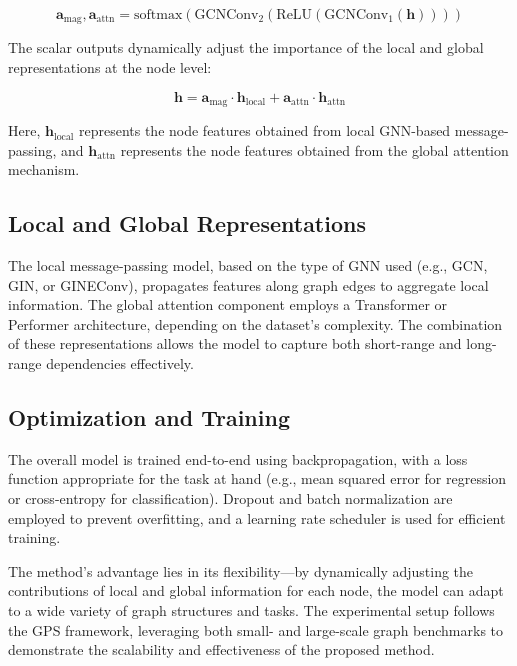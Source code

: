 \documentclass{acmart}
\begin{document}
\begin{equation}
\mathbf{a}_{\text{mag}}, \mathbf{a}_{\text{attn}} = \text{softmax}\left(\text{GCNConv}_2\left(\text{ReLU}\left(\text{GCNConv}_1(\mathbf{h})\right)\right)\right)
\end{equation}

The scalar outputs dynamically adjust the importance of the local and global representations at the node level:

\begin{equation}
\mathbf{h} = \mathbf{a}_{\text{mag}} \cdot \mathbf{h}_{\text{local}} + \mathbf{a}_{\text{attn}} \cdot \mathbf{h}_{\text{attn}}
\end{equation}

Here, $\mathbf{h}_{\text{local}}$ represents the node features obtained from local GNN-based message-passing, and $\mathbf{h}_{\text{attn}}$ represents the node features obtained from the global attention mechanism.

\subsection{Local and Global Representations}

The local message-passing model, based on the type of GNN used (e.g., GCN, GIN, or GINEConv), propagates features along graph edges to aggregate local information. The global attention component employs a Transformer or Performer architecture, depending on the dataset's complexity. The combination of these representations allows the model to capture both short-range and long-range dependencies effectively.

\subsection{Optimization and Training}

The overall model is trained end-to-end using backpropagation, with a loss function appropriate for the task at hand (e.g., mean squared error for regression or cross-entropy for classification). Dropout and batch normalization are employed to prevent overfitting, and a learning rate scheduler is used for efficient training.

The method's advantage lies in its flexibility—by dynamically adjusting the contributions of local and global information for each node, the model can adapt to a wide variety of graph structures and tasks. The experimental setup follows the GPS framework, leveraging both small- and large-scale graph benchmarks to demonstrate the scalability and effectiveness of the proposed method.
\end{document}
